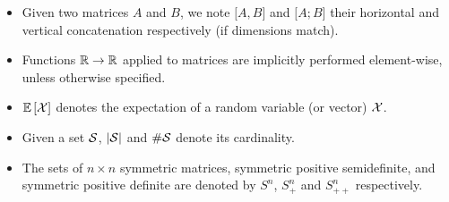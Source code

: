 \begin{itemize}
    \item Given two matrices $A$ and $B$, we note $\big[ A, B \big]$ and $\big[ A; B \big]$ their horizontal and
    vertical concatenation respectively (if dimensions match).
    \item Functions $\mathbb{R} \to \mathbb{R}$ applied to matrices are implicitly performed element-wise, unless otherwise specified.
    \item ${\mathbb E}\left[\mathcal{X}\right]$ denotes the expectation of a random variable (or vector) $\mathcal{X}$.
    \item Given a set $\mathcal{S}$, $\left\lvert\mathcal{S}\right\rvert$ and $\#\mathcal{S}$ denote its cardinality.
    \item The sets of $n \times n$ symmetric matrices,
    symmetric positive semidefinite,
    and symmetric positive definite
    are denoted by $S^n$, $S^n_+$ and $S^n_{++}$ respectively.
\end{itemize}
